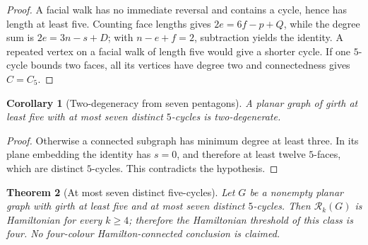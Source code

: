 \documentclass[11pt]{article}
\newtheorem{theorem}{Theorem}[section]
\newtheorem{corollary}[theorem]{Corollary}
\theoremstyle{remark}
\newcommand{\Rk}{\mathcal R_k}
\numberwithin{equation}{section}
\begin{document}
\begin{proof}
A facial walk has no immediate reversal and contains a cycle, hence has
length at least five.  Counting face lengths gives
$2e=6f-p+Q$, while the degree sum is $2e=3n-s+D$; with $n-e+f=2$,
subtraction yields the identity.  A repeated vertex on a facial walk of
length five would give a shorter cycle.  If one $5$-cycle bounds two faces,
all its vertices have degree two and connectedness gives $C=C_5$.
\end{proof}

\begin{corollary}[Two-degeneracy from seven pentagons]
\label{cor:seven-pentagons-two-degenerate}
A planar graph of girth at least five with at most seven distinct $5$-cycles
is two-degenerate.
\end{corollary}

\begin{proof}
Otherwise a connected subgraph has minimum degree at least three.  In its
plane embedding the identity has $s=0$, and therefore at least twelve
$5$-faces, which are distinct $5$-cycles.  This contradicts the hypothesis.
\end{proof}

\begin{theorem}[At most seven distinct five-cycles]
\label{thm:seven-pentagons}
Let $G$ be a nonempty planar graph with girth at least five and at most
seven distinct $5$-cycles.  Then $\Rk(G)$ is Hamiltonian for every $k\ge4$;
therefore the Hamiltonian threshold of this class is four.  No
four-colour Hamilton-connected conclusion is claimed.
\end{theorem}
\end{document}
